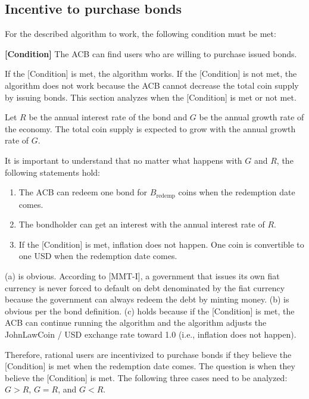 \documentclass[dvipdfmx,a4paper]{article}
\begin{document}
\subsection{Incentive to purchase bonds}

For the described algorithm to work, the following condition must be met:

\begin{description}
\item{\textbf{[Condition]}} The ACB can find users who are willing to purchase issued bonds.
\end{description}

If the [Condition] is met, the algorithm works. If the [Condition] is not met, the algorithm does not work because the ACB cannot decrease the total coin supply by issuing bonds. This section analyzes when the [Condition] is met or not met.

Let $R$ be the annual interest rate of the bond and $G$ be the annual growth rate of the economy. The total coin supply is expected to grow with the annual growth rate of $G$. 

It is important to understand that no matter what happens with $G$ and $R$, the following statements hold:

\begin{enumerate}
\renewcommand{\labelenumi}{(\alph{enumi})}
\item The ACB can redeem one bond for $B_{\mathrm{redemp}}$ coins when the redemption date comes.
\item The bondholder can get an interest with the annual interest rate of $R$.
\item If the [Condition] is met, inflation does not happen. One coin is convertible to one USD when the redemption date comes.
\end{enumerate}

(a) is obvious. According to [MMT-I], a government that issues its own fiat currency is never forced to default on debt denominated by the fiat currency because the government can always redeem the debt by minting money. (b) is obvious per the bond definition. (c) holds because if the [Condition] is met, the ACB can continue running the algorithm and the algorithm adjusts the JohnLawCoin / USD exchange rate toward 1.0 (i.e., inflation does not happen).

Therefore, rational users are incentivized to purchase bonds if they believe the [Condition] is met when the redemption date comes. The question is when they believe the [Condition] is met. The following three cases need to be analyzed: $G>R$, $G=R$, and $G<R$.
\end{document}
